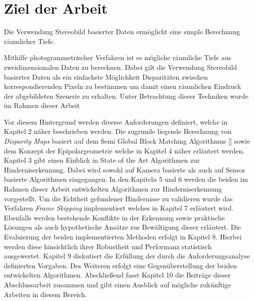 \section{Ziel der Arbeit}
\label{sec:ziel_der_arbeit}
Die Verwendung Stereobild basierter Daten ermöglicht eine simple Berechnung räumlicher Tiefe.

Mithilfe photogrammetrischer Verfahren ist es mögliche räumliche Tiefe aus zweidimensionalen Daten zu berechnen. Dabei gilt die Verwendung Stereobild basierter Daten als ein einfachste Möglichkeit Disparitäten zwischen korrespondierenden Pixeln zu bestimmen um damit einen räumlichen Eindruck der abgebildeten Szenerie zu erhalten. Unter Betrachtung dieser Techniken wurde im Rahmen dieser Arbeit 

Vor diesem Hintergrund werden diverse Anforderungen definiert, welche in Kapitel 2 näher beschrieben werden. Die zugrunde liegende Berechnung von \emph{Disparity Maps} basiert auf dem Semi Global Block Matching Algorithmus [\cite{hirschmuller2005sgm}] sowie dem Konzept der Epipolargeometrie welche in Kapitel 4 näher erläutert werden. Kapitel 3 gibt einen Einblick in State of the Art Algorithmen zur Hinderniserkennung. Dabei wird sowohl auf Kamera basierte als auch auf Sensor basierte Algorithmen eingegangen. In den Kapiteln 5 und 6 werden die beiden im Rahmen dieser Arbeit entwickelten Algorithmen zur Hinderniserkennung vorgestellt. Um die Echtheit gefundener Hindernisse zu validieren wurde das Verfahren \emph{Frame Skipping} implementiert welches in Kapitel 7 erläutert wird. Ebenfalls werden bestehende Konflikte in der Erkennung sowie praktische Lösungen als auch hypothetische Ansätze zur Bewältigung dieser erläutert. Die Evaluierung der beiden implementierten Methoden erfolgt in Kapitel 8. Hierbei werden diese hinsichtlich ihrer Robustheit und Performanz statistisch ausgewertet. Kapitel 9 diskutiert die Erfüllung der durch die Anforderungsanalyse definierten Vorgaben. Des Weiteren erfolgt eine Gegenüberstellung der beiden entwickelten Algorithmen. Abschließend fasst Kapitel 10 die Beiträge dieser Abschlussarbeit zusammen und gibt einen Ausblick auf mögliche zukünftige Arbeiten in diesem Bereich.